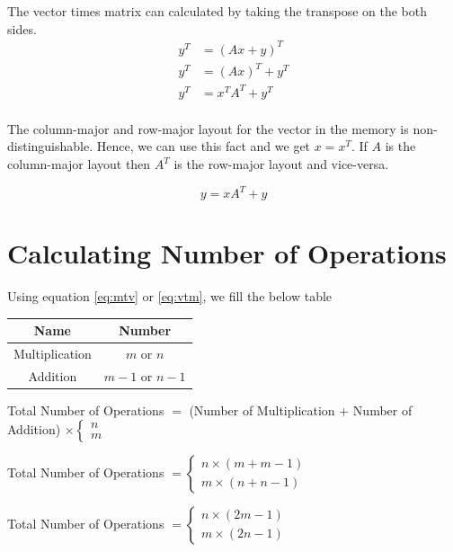 \vspace*{0.5 cm}
The vector times matrix can calculated by taking the transpose on the both sides.
\begin{align*}
    y^T &= (Ax + y)^T\\
    y^T &= (Ax)^T + y^T\\
    y^T &= x^TA^T + y^T\\
\end{align*}

The column-major and row-major layout for the vector in the memory 
is non-distinguishable. Hence, we can use this fact and we get $x = x^T$.
If $A$ is the column-major layout then $A^T$ is the row-major layout and vice-versa.

\begin{equation}
    y = xA^T + y
    \label{eq:vtm}
\end{equation}

\clearpage
\section{Calculating Number of Operations}

Using equation \ref{eq:mtv} or \ref{eq:vtm}, we fill the below table

\begin{table}[ht]
    \centering
    \begin{tabular}{|c|c|}
        \hline
        \textbf{Name} & \textbf{Number} \\
        \hline
        Multiplication & $m$ or $n$\\
        \hline
        Addition & $m-1$ or $n-1$ \\
        \hline
    \end{tabular}
\end{table}

Total Number of Operations $=$ (Number of Multiplication $+$ Number of Addition) $\times
\begin{cases}
    n \\
    m
\end{cases}
$

Total Number of Operations $= 
\begin{cases}
    n \times (m + m - 1)\\
    m  \times (n + n - 1)
\end{cases}
$

Total Number of Operations $= 
\begin{cases}
    n \times (2m - 1)\\
    m  \times (2n - 1)
\end{cases}
$

